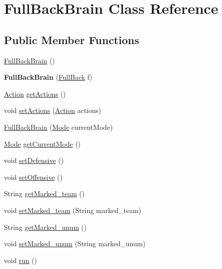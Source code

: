 \hypertarget{classFullBackBrain}{
\section{FullBackBrain Class Reference}
\label{classFullBackBrain}
}
\subsection*{Public Member Functions}
\begin{DoxyCompactItemize}
\item 
\hyperlink{classFullBackBrain_a2a53a863ccd30fbd43b5285ec0c7b1ac}{FullBackBrain} ()
\item 
\hypertarget{classFullBackBrain_ad6645be203fec276ab293fd3b07e4759}{
{\bfseries FullBackBrain} (\hyperlink{classFullBack}{FullBack} f)}
\label{classFullBackBrain_ad6645be203fec276ab293fd3b07e4759}

\item 
\hyperlink{classAction}{Action} \hyperlink{classFullBackBrain_aac424857e8fa16dd8063a693a05fd82c}{getActions} ()
\item 
void \hyperlink{classFullBackBrain_ae0cd755da77577c80bd8fc76fe1c32f6}{setActions} (\hyperlink{classAction}{Action} actions)
\item 
\hyperlink{classFullBackBrain_a894e2167f34ee125b3b389664d1783ac}{FullBackBrain} (\hyperlink{classMode}{Mode} currentMode)
\item 
\hyperlink{classMode}{Mode} \hyperlink{classFullBackBrain_ab3fb7e8023f8e159054ccf80d1f3feca}{getCurrentMode} ()
\item 
void \hyperlink{classFullBackBrain_aa442cadff3e7304081b91d3209363fb4}{setDefensive} ()
\item 
void \hyperlink{classFullBackBrain_adc29e16b7c59d28fa182f4abb230391b}{setOffensive} ()
\item 
String \hyperlink{classFullBackBrain_a1f24e2f70fc6c841337ae6e0116811c6}{getMarked\_\-team} ()
\item 
void \hyperlink{classFullBackBrain_ac58e4c02d57b47da53bc648ef9be0bcd}{setMarked\_\-team} (String marked\_\-team)
\item 
String \hyperlink{classFullBackBrain_aa2d0607988db96aa3158258b855af250}{getMarked\_\-unum} ()
\item 
void \hyperlink{classFullBackBrain_a027bf0f42606b3be61ee79e8f6125740}{setMarked\_\-unum} (String marked\_\-unum)
\item 
void \hyperlink{classFullBackBrain_adf3bd808476349ee7aafca09a4efb86d}{run} ()
\end{DoxyCompactItemize}
